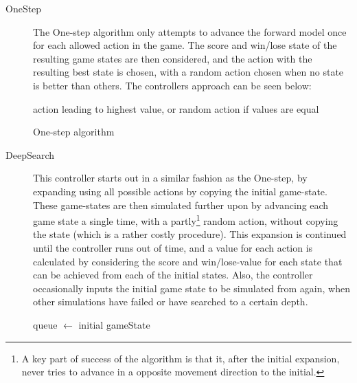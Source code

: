 \documentclass[a4paper,titlepage,final]{report}
\begin{document}
\begin{description}
\item[OneStep] The One-step algorithm only attempts to advance the forward model once for each allowed action in the game.
The score and win/lose state of the resulting game states are then considered, and the action with the resulting best state is chosen, with a random action chosen when no state is better than others.
The controllers approach can be seen below:

\begin{algorithm}[H]
\Return action leading to highest value, or random action if values are equal
\caption{One-step algorithm}
\end{algorithm}

\item[DeepSearch]
This controller starts out in a similar fashion as the One-step, by expanding using all possible actions by copying the initial game-state.
These game-states are then simulated further upon by advancing each game state a single time, with a partly\footnote{A key part of success of the algorithm is that it, after the initial expansion, never tries to advance in a opposite movement direction to the initial.} random action, without copying the state (which is a rather costly procedure).
This expansion is continued until the controller runs out of time, and a value for each action is calculated by considering the score and win/lose-value for each state that can be achieved from each of the initial states. 
Also, the controller occasionally inputs the initial game state to be simulated from again, when other simulations have failed or have searched to a certain depth. 

\begin{algorithm}[H]
queue $\gets$ initial gameState \\
\end{algorithm}
\end{description}
\end{document}
